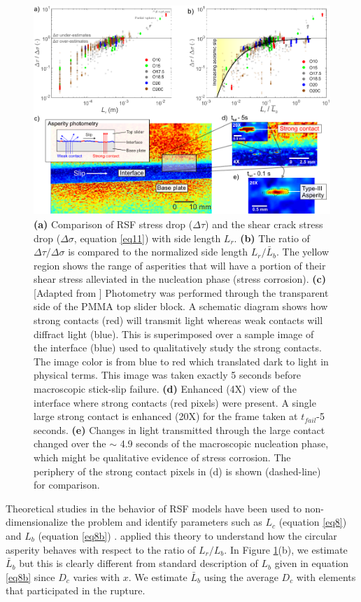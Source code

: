 \documentclass[draft]{agujournal2019}
\begin{document}
\begin{figure}
       	\centering
	\includegraphics[scale= 0.95]{FIG13.pdf} 
	\caption{\textbf{(a)} Comparison of RSF stress drop ($\Delta\tau$) and the shear crack stress drop ($\Delta\sigma$, equation \eqref{eq11}) with side length $L_{r}$.  \textbf{(b)} The ratio of $\Delta\tau/\Delta\sigma$ is compared to the normalized side length $L_{r}/\bar{L}_{b}$. The yellow region shows the range of asperities that will have a portion of their shear stress alleviated in the nucleation phase (stress corrosion). \textbf{(c)} [Adapted from ] Photometry was performed through the transparent side of the PMMA top slider block. A schematic diagram shows how strong contacts (red) will transmit light whereas weak contacts will diffract light (blue). This is superimposed over a sample image of the interface (blue) used to qualitatively study the strong contacts. The image color is from blue to red which translated dark to light in physical terms. This image was taken exactly 5 seconds before macroscopic stick-slip failure. \textbf{(d)} Enhanced (4X) view of the interface where strong contacts (red pixels) were present. A single large strong contact is enhanced (20X) for the frame taken at $t_{fail}$-5 seconds.  \textbf{(e)} Changes in light transmitted through the large contact changed over the $\sim$ 4.9 seconds of the macroscopic nucleation phase, which might be qualitative evidence of stress corrosion. The periphery of the strong contact pixels in (d) is shown (dashed-line) for comparison.}
	\label{fig13} 
\end{figure}

Theoretical studies in the behavior of RSF models have been used to non-dimensionalize the problem and identify parameters such as $L_{c}$ (equation \eqref{eq8}) and $L_{b}$ (equation \eqref{eq8b}) \cite{Ruina1983, Ranjith1999, Rubin2005, Ampuero2008}.  applied this theory to understand how the circular asperity behaves with respect to the ratio of $L_{r}/L_{b}$. In Figure \ref{fig13}(b), we estimate $\bar{L}_{b}$ but this is clearly different from standard description of $L_{b}$ given in equation \eqref{eq8b} since $D_{c}$ varies with $x$.  We estimate $\bar{L}_{b}$ using the average $D_{c}$ with elements that participated in the rupture.
\end{document}
